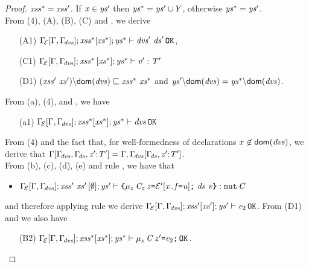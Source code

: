 {\begin{proof}
$\mathit{xss}^{\ast}=\mathit{xss}'$. If $\mathit{x}\in\mathit{ys}'$ then $\mathit{ys}^{\ast}=\mathit{ys}'\cup Y$,
otherwise $\mathit{ys}^{\ast}=\mathit{ys}'$.\\
From (4), (A), (B), (C) and , we derive
\begin{itemize}
\item [(A1)] $\AuxDecsOK{{\SubstFun{\TypeEnv{\ctx}}{\Gamma,\TypeEnv{\dvs}}}}{\LentLocked^{\ast}}{\MutGroup^{\ast}}{\StronglyLocked^{\ast}}{\dvs'\ \decs'}$,
\item [(C1)] $\Gamma_{\!{\cal{E}}}[\Gamma,\Gamma_{\!\mathit{dvs}}];\mathit{xss}^{\ast}\,[\mathit{xs}^{\ast}];\mathit{ys}^{\ast}\vdash \mathit{v}':\mathit{T}'$
\item [(D1)]  $\LessEq{(\LentLocked'\ \xs'){\setminus}{\dom{\dvs}}}{\LentLocked^{\ast}\ \xs^{\ast}}$ and  $\mathit{ys}'{\setminus}{\textsf{dom}(\mathit{dvs})}=\mathit{ys}^{\ast}{\setminus}{\textsf{dom}(\mathit{dvs})}$.
\end{itemize}
From (a), (4), and , we have
\begin{itemize}
\item [(a1)] ${\Gamma_{\!{\cal{E}}}[{\Gamma,\Gamma_{\!\mathit{dvs}}}]};\mathit{xss}^{\ast}[\mathit{xs}^{\ast}];\mathit{ys}^{\ast}\vdash \mathit{dvs}\,{\tt OK}$
\end{itemize}
From (4) and the fact that, for well-formedness of
declarations $x\not\in\textsf{dom}(\mathit{dvs})$, we derive
that $\Gamma[\Gamma_{\!\mathit{dvs}},\Gamma_{\!\mathit{ds}},\mathit{z}'{:}\mathit{T}']=\Gamma,\Gamma_{\!\mathit{dvs}}[\Gamma_{\!\mathit{ds}},\mathit{z}'{:}\mathit{T}']$.\\
From (b), (c), (d), (e) and  rule ,  we have that 
\begin{itemize}
\item$\AuxTypeCheck{{\SubstFun{\TypeEnv{\ctx}}{\Gamma,\TypeEnv{\dvs}}}}{\LentLocked'\ \xs'}{\emptyset}{\StronglyLocked'}{\Block{\Dec{\Type{\mu_z}{\C_z}}{\z}{\CtxP{\FieldAssign{\x}{\f}{\valPrime}}}\ \decs}{\val}}
{\Type{\mutable}{\C}}
$
\end{itemize}
and therefore applying rule  we derive ${\Gamma_{\!{\cal{E}}}[\Gamma,\Gamma_{\!\mathit{dvs}}]};\mathit{xss}'[\mathit{xs}'];\mathit{ys}'\vdash \mathit{e}_2\,{\tt OK}
$. 
From (D1) and  we also have 
\begin{itemize}
\item [(B2)] ${\Gamma_{\!{\cal{E}}}[\Gamma,\Gamma_{\!\mathit{dvs}}]};\mathit{xss}^{\ast}[\mathit{xs}^{\ast}];\mathit{ys}^{\ast}\vdash \mu_z\,\mathit{C}\,\mathit{z}'\texttt{=}\mathit{e}_2\texttt{;}\,{\tt OK}
$. 
\end{itemize} 

\end{proof}}
